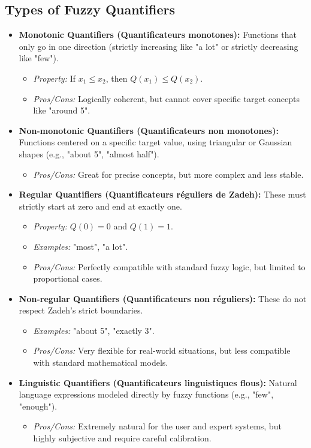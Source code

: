 \documentclass[11pt,a4paper]{article}
\begin{document}
\subsection{Types of Fuzzy Quantifiers}
\begin{itemize}
    \item \textbf{Monotonic Quantifiers (Quantificateurs monotones):} Functions that only go in one direction (strictly increasing like "a lot" or strictly decreasing like "few").
    \begin{itemize}
        \item \textit{Property:} If $x_1 \leq x_2$, then $Q(x_1) \leq Q(x_2)$.
        \item \textit{Pros/Cons:} Logically coherent, but cannot cover specific target concepts like "around 5".
    \end{itemize}
    \item \textbf{Non-monotonic Quantifiers (Quantificateurs non monotones):} Functions centered on a specific target value, using triangular or Gaussian shapes (e.g., "about 5", "almost half").
    \begin{itemize}
        \item \textit{Pros/Cons:} Great for precise concepts, but more complex and less stable.
    \end{itemize}
    \item \textbf{Regular Quantifiers (Quantificateurs réguliers de Zadeh):} These must strictly start at zero and end at exactly one.
    \begin{itemize}
        \item \textit{Property:} $Q(0) = 0$ and $Q(1) = 1$.
        \item \textit{Examples:} "most", "a lot".
        \item \textit{Pros/Cons:} Perfectly compatible with standard fuzzy logic, but limited to proportional cases.
    \end{itemize}
    \item \textbf{Non-regular Quantifiers (Quantificateurs non réguliers):} These do not respect Zadeh's strict boundaries.
    \begin{itemize}
        \item \textit{Examples:} "about 5", "exactly 3".
        \item \textit{Pros/Cons:} Very flexible for real-world situations, but less compatible with standard mathematical models.
    \end{itemize}
    \item \textbf{Linguistic Quantifiers (Quantificateurs linguistiques flous):} Natural language expressions modeled directly by fuzzy functions (e.g., "few", "enough").
    \begin{itemize}
        \item \textit{Pros/Cons:} Extremely natural for the user and expert systems, but highly subjective and require careful calibration.
    \end{itemize}
\end{itemize}
\end{document}

